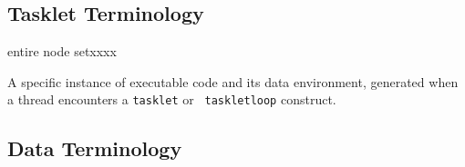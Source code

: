 \subsection{Tasklet Terminology}

\begin{namelist}{entire node setxxxx}


  A specific instance of executable code and its data environment,
  generated when a thread encounters a {\tt tasklet} or {\tt
  taskletloop} construct.

\end{namelist}


\subsection{Data Terminology}

